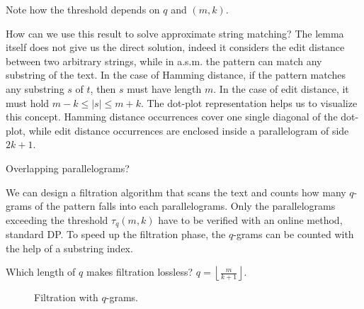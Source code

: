 Note how the threshold depends on $q$ and $(m,k)$.

How can we use this result to solve approximate string matching?
The lemma itself does not give us the direct solution, indeed it considers the edit distance between two arbitrary strings, while in a.s.m. the pattern can match any substring of the text.
In the case of Hamming distance, if the pattern matches any substring $s$ of $t$, then $s$ must have length $m$.
In the case of edit distance, it must hold $m - k \leq |s| \leq m + k$.
The dot-plot representation helps us to visualize this concept.
Hamming distance occurrences cover one single diagonal of the dot-plot, while edit distance occurrences are enclosed inside a parallelogram of side $2k+1$.

Overlapping parallelograms?

We can design a filtration algorithm that scans the text and counts how many $q$-grams of the pattern falls into each parallelograms.
Only the parallelograms exceeding the threshold $\tau_q(m,k)$ have to be verified with an online method, \eg standard DP.
To speed up the filtration phase, the $q$-grams can be counted with the help of a substring index.

Which length of $q$ makes filtration lossless? $q=\left \lfloor \frac{m}{k+1} \right \rfloor$.

\begin{figure}[h]
\begin{center}
\caption{Filtration with $q$-grams.}
\label{fig:qgrams-ext}

\end{center}
\end{figure}
